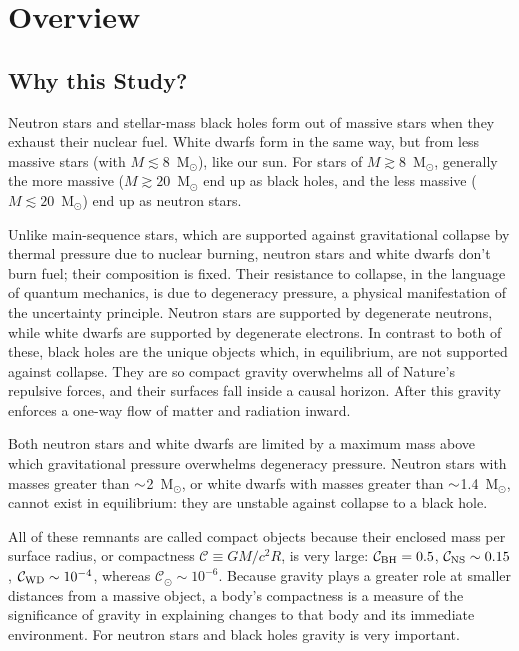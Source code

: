 \chapter{Overview}
\label{chap:overview}

\section{Why this Study?}

Neutron stars and stellar-mass black holes form out of massive stars when they
exhaust their nuclear fuel. White dwarfs form in the same way, but from less
massive stars (with $M\lesssim 8$~M$_{\odot}$), like our sun.
For stars of $M\gtrsim 8$~M$_{\odot}$, generally the more massive
($M\gtrsim 20$~M$_{\odot}$ end up as black holes, and the less massive
($M\lesssim 20$~M$_{\odot}$) end up as neutron stars.
\citep{woos2002-review_stellar_evolution}

Unlike main-sequence stars, which are supported against gravitational collapse
by thermal pressure due to nuclear burning, neutron stars and white dwarfs
don't burn fuel; their composition is fixed.
Their resistance to collapse, in the language of quantum mechanics, is due
to degeneracy pressure, a physical manifestation of the uncertainty principle.
Neutron stars are supported by degenerate neutrons, while white dwarfs are
supported by degenerate electrons. In contrast to both of these, black holes
are the unique objects which, in equilibrium, are not supported against
collapse. They are so compact gravity overwhelms all of Nature's repulsive
forces, and their surfaces fall inside a causal horizon. After this gravity
enforces a one-way flow of matter and radiation inward.

Both neutron stars and white dwarfs are limited by a maximum mass above which
gravitational pressure overwhelms degeneracy pressure. Neutron stars with masses
greater than $\mathord{\sim}$2~M$_\odot$, or white dwarfs with masses greater than
$\mathord{\sim}$1.4~M$_\odot$, cannot exist in equilibrium: they are unstable against
collapse to a black hole.

All of these remnants are called compact objects because their enclosed mass per
surface radius, or compactness $\mathcal{C}\equiv G M/c^2 R$, is very large:
$\mathcal{C}_{\rm BH}=0.5$,
$\mathcal{C}_{\rm NS}\sim0.15$,
$\mathcal{C}_{\rm WD}\sim10^{-4}$,
whereas $\mathcal{C}_{\odot}\sim10^{-6}$.
Because gravity plays a greater role at smaller distances from a massive object,
a body's compactness is a measure of the significance of gravity
in explaining changes to that body and its immediate environment.
For neutron stars and black holes gravity is very important.

